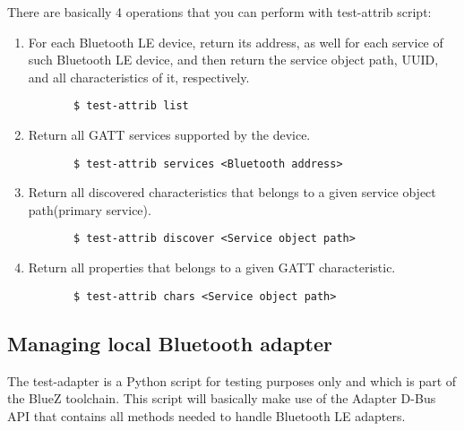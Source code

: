 \documentclass[11pt]{article}
\begin{document}
There are basically 4 operations that you can perform with test-attrib
script:
\begin{enumerate}
   \item For each Bluetooth LE device, return its address, as well for
     each service of such Bluetooth LE device, and then return the service
     object path, UUID, and all characteristics of it, respectively.
     \begin{verbatim}
       $ test-attrib list
     \end{verbatim}
   \item Return all GATT services supported by the device.
     \begin{verbatim}
       $ test-attrib services <Bluetooth address>
     \end{verbatim}
   \item Return all discovered characteristics that belongs to a
     given service object path(primary service).
     \begin{verbatim}
       $ test-attrib discover <Service object path>
     \end{verbatim}
   \item Return all properties that belongs to a given GATT characteristic.
     \begin{verbatim}
       $ test-attrib chars <Service object path>
     \end{verbatim}
\end{enumerate}

\subsection{Managing local Bluetooth adapter}
The test-adapter is a Python script for testing purposes only and which is part
of the BlueZ toolchain. This script will basically make use of the
Adapter D-Bus API that contains all methods needed to handle Bluetooth LE
adapters.
\end{document}
